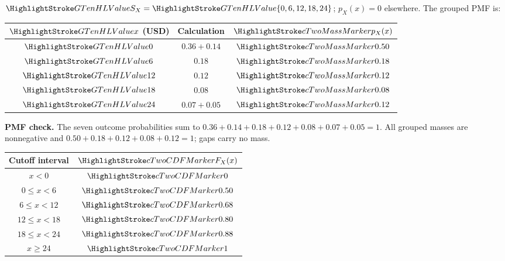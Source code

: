   $\cTwoValue{S_X}=\cTwoValue{\{0,6,12,18,24\}}$; $p_X(x)=0$ elsewhere. The grouped PMF is:
  \par%
  \noindent%
  \begin{minipage}[t]{.37\linewidth}%
    \vspace{0pt}\centering
    \begin{tabular}{ccc}%
      \toprule
      $\cTwoValue{x}$ (USD) & Calculation & $\cTwoMassHL{p_X(x)}$ \\ \midrule
      $\cTwoValue{0}$ & $0.36+0.14$ & $\cTwoMassHL{0.50}$ \\
      $\cTwoValue{6}$ & $0.18$ & $\cTwoMassHL{0.18}$ \\
      $\cTwoValue{12}$ & $0.12$ & $\cTwoMassHL{0.12}$ \\
      $\cTwoValue{18}$ & $0.08$ & $\cTwoMassHL{0.08}$ \\
      $\cTwoValue{24}$ & $0.07+0.05$ & $\cTwoMassHL{0.12}$ \\
      \bottomrule%
    \end{tabular}
  \end{minipage}%
  \hfill%
  \begin{minipage}[t]{.60\linewidth}%
    \vspace{0pt}\centering
  \end{minipage}%
  \par
  \textbf{PMF check.} The seven outcome probabilities sum to
  $0.36+0.14+0.18+0.12+0.08+0.07+0.05=1$.
  All grouped masses are nonnegative and $0.50+0.18+0.12+0.08+0.12=1$; gaps carry no mass.
  \par%
  \noindent%
  \begin{minipage}[t]{.37\linewidth}%
    \vspace{0pt}\centering
    \begin{tabular}{cc}%
      \toprule
      Cutoff interval & $\cTwoCDFHL{F_X(x)}$ \\ \midrule
      $x<0$ & $\cTwoCDFHL{0}$ \\
      $0\leq x<6$ & $\cTwoCDFHL{0.50}$ \\
      $6\leq x<12$ & $\cTwoCDFHL{0.68}$ \\
      $12\leq x<18$ & $\cTwoCDFHL{0.80}$ \\
      $18\leq x<24$ & $\cTwoCDFHL{0.88}$ \\
      $x\geq24$ & $\cTwoCDFHL{1}$ \\
      \bottomrule%
    \end{tabular}
  \end{minipage}%
